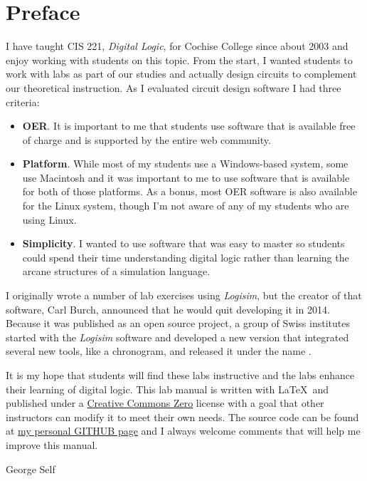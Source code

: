 \chapter*{Preface}\label{preface}

I have taught CIS 221, \textit{Digital Logic}, for Cochise College since about 2003 and enjoy working with students on this topic. From the start, I wanted students to work with labs as part of our studies and actually design circuits to complement our theoretical instruction. As I evaluated circuit design software I had three criteria:

\begin{itemize}
  \item \textbf{\ac{OER}}. It is important to me that students use software that is available free of charge and is supported by the entire web community. 
  \item \textbf{Platform}. While most of my students use a Windows-based system, some use Macintosh and it was important to me to use software that is available for both of those platforms. As a bonus, most OER software is also available for the Linux system, though I'm not aware of any of my students who are using Linux.
  \item \textbf{Simplicity}. I wanted to use software that was easy to master so students could spend their time understanding digital logic rather than learning the arcane structures of a simulation language.
\end{itemize}

I originally wrote a number of lab exercises using \textit{Logisim}, but the creator of that software, Carl Burch, announced that he would quit developing it in 2014. Because it was published as an open source project, a group of Swiss institutes started with the \textit{Logisim} software and developed a new version that integrated several new tools, like a chronogram, and released it under the name \LE.

It is my hope that students will find these labs instructive and the labs enhance their learning of digital logic. This lab manual is written with \LaTeX\ and published under a \href{https://creativecommons.org/publicdomain/zero/1.0/}{Creative Commons Zero} license with a goal that other instructors can modify it to meet their own needs. The source code can be found at \href{https://github.com/grself/CIS221_Lab_Manual}{my personal GITHUB page} and I always welcome comments that will help me improve this manual.

\bigskip
\begin{flushright}
  \textemdash  George Self
\end{flushright}


